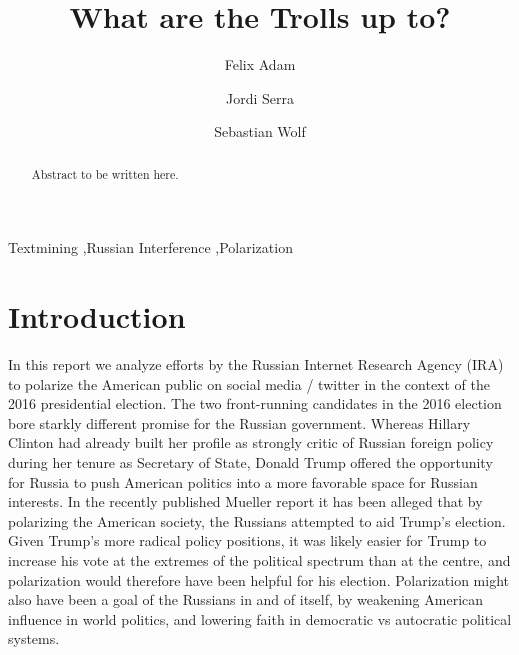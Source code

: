 \documentclass[12pt, authoryear]{elsarticle}
\begin{document}
\begin{frontmatter}  %

\title{What are the Trolls up to?}


\author[Add1]{Felix Adam}

\author[Add1]{Jordi Serra}

\author[Add1]{Sebastian Wolf}

\address[Add1]{Barcelona Graduate School of Economics, Barcelona, Spain}

\begin{abstract}
\small{
Abstract to be written here.
}
\end{abstract}

\vspace{1cm}

\begin{keyword}
\footnotesize{
Textmining \sep Russian Interference \sep Polarization  \\ \vspace{0.3cm}
}
\end{keyword}
\vspace{0.5cm}
\end{frontmatter}

\headsep 35pt %
\section{Introduction}\label{intro}

In this report we analyze efforts by the Russian Internet Research Agency (IRA) to polarize the American public on social media / twitter in the context of the 2016 presidential election. The two front-running candidates in the 2016 election bore starkly different promise for the Russian government. Whereas Hillary Clinton had already built her profile as strongly critic of Russian foreign policy during her tenure as Secretary of State, Donald Trump offered the opportunity for Russia to push American politics into a more favorable space for Russian interests. In the recently published Mueller report it has been alleged that by polarizing the American society, the Russians attempted to aid Trump's election. Given Trump's more radical policy positions, it was likely easier for Trump to increase his vote at the extremes of the political spectrum than at the centre, and polarization would therefore have been helpful for his election. Polarization might also have been a goal of the Russians in and of itself, by weakening American influence in world politics, and lowering faith in democratic vs autocratic political systems.
\end{document}
